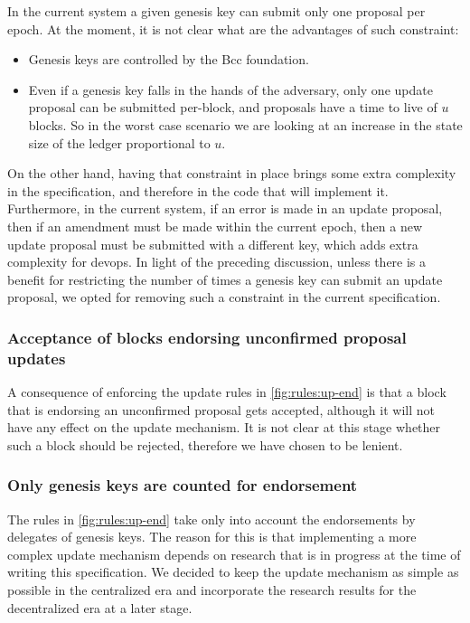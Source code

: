 In the current system a given genesis key can submit only one proposal per
epoch. At the moment, it is not clear what are the advantages of such
constraint:
\begin{itemize}
\item Genesis keys are controlled by the Bcc foundation.
\item Even if a genesis key falls in the hands of the adversary, only one
  update proposal can be submitted per-block, and proposals have a time to live of $u$ blocks. So in the worst case scenario we are looking at an
  increase in the state size of the ledger proportional to $u$.
\end{itemize}
On the other hand, having that constraint in place brings some extra complexity
in the specification, and therefore in the code that will implement it.
Furthermore, in the current system, if an error is made in an update proposal,
then if an amendment must be made within the current epoch, then a new update
proposal must be submitted with a different key, which adds extra complexity
for devops. In light of the preceding discussion, unless there is a benefit for
restricting the number of times a genesis key can submit an update proposal, we
opted for removing such a constraint in the current specification.

\subsubsection{Acceptance of blocks endorsing unconfirmed proposal updates}
\label{sec:acceptance-of-uncofirmed-up-endorsements}

A consequence of enforcing the update rules in \cref{fig:rules:up-end} is that
a block that is endorsing an unconfirmed proposal gets accepted, although it
will not have any effect on the update mechanism. It is not clear at this stage
whether such a block should be rejected, therefore we have chosen to be lenient.

\subsubsection{Only genesis keys are counted for endorsement}
\label{sec:only-genesis-keys-count-for-endorsement}

The rules in \cref{fig:rules:up-end} take only into account the endorsements by
delegates of genesis keys. The reason for this is that implementing a more
complex update mechanism depends on research that is in progress at the time of
writing this specification. We decided to keep the update mechanism as simple
as possible in the centralized era and incorporate the research results for the
decentralized era at a later stage.
